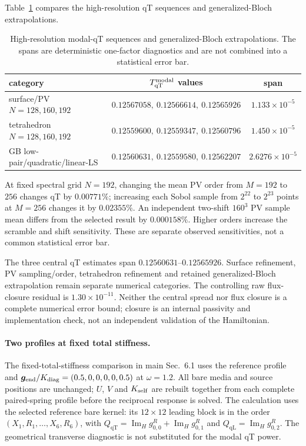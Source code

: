\documentclass[10pt,aps,onecolumn,notitlepage,nofootinbib]{revtex4-2}
\newcommand{\qT}{\mathrm{qT}}
\newcommand{\qL}{\mathrm{qL}}
\newcommand{\ImH}{\operatorname{Im}_{\!H}}
\begin{document}
Table~\ref{tab:sm-high-resolution} compares the high-resolution qT sequences and generalized-Bloch extrapolations.

\begin{table}[htbp]
\caption{High-resolution modal-qT sequences and generalized-Bloch extrapolations. The spans are deterministic one-factor diagnostics and are not combined into a statistical error bar.}
\label{tab:sm-high-resolution}
\begin{ruledtabular}\begin{tabular}{lcc}
category & $T_{\qT}^{\rm modal}$ values & span\\\hline
surface/PV $N=128,160,192$ & $0.12567058,\ 0.12566614,\ 0.12565926$ & $1.133\times10^{-5}$\\
tetrahedron $N=128,160,192$ & $0.12559600,\ 0.12559347,\ 0.12560796$ & $1.450\times10^{-5}$\\
GB low-pair/quadratic/linear-LS & $0.12560631,\ 0.12559580,\ 0.12562207$ & $2.6276\times10^{-5}$\\
\end{tabular}\end{ruledtabular}
\end{table}
At fixed spectral grid $N=192$, changing the mean PV order from $M=192$ to $256$ changes qT by $0.00771\%$; increasing each Sobol sample from $2^{22}$ to $2^{23}$ points at $M=256$ changes it by $0.02355\%$. An independent two-shift $160^3$ PV sample mean differs from the selected result by $0.000158\%$. Higher orders increase the scramble and shift sensitivity. These are separate observed sensitivities, not a common statistical error bar.

The three central qT estimates span $0.12560631$--$0.12565926$. Surface refinement, PV sampling/order, tetrahedron refinement and retained generalized-Bloch extrapolation remain separate numerical categories. The controlling raw flux-closure residual is $1.30\times10^{-11}$. Neither the central spread nor flux closure is a complete numerical error bound; closure is an internal passivity and implementation check, not an independent validation of the Hamiltonian.


\paragraph*{Two profiles at fixed total stiffness.}
The fixed-total-stiffness comparison in main Sec.~6.1 uses the reference
profile and
$\bm g_{\rm end}/K_{\rm diag}=(0.5,0,0,0,0,0.5)$ at $\omega=1.2$.
All bare media and source positions are unchanged; $U$, $V$ and
$K_{\rm self}$ are rebuilt together from each complete paired-spring
profile before the reciprocal response is solved.  The calculation uses
the selected reference bare kernel: its $12\times12$ leading block is
in the order $(X_1,R_1,\ldots,X_6,R_6)$, with
$Q_{\qT}=\ImH g_{0,0}^R+\ImH g_{0,1}^R$ and
$Q_{\qL}=\ImH g_{0,2}^R$.  The geometrical transverse diagnostic is not
substituted for the modal qT power.
\end{document}
